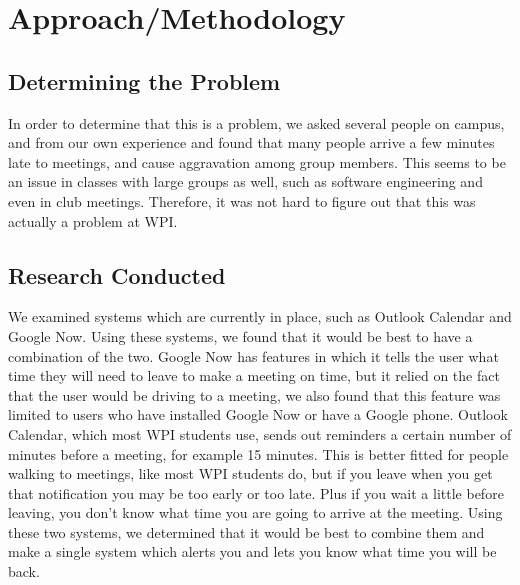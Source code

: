 \section{Approach/Methodology}

\subsection{Determining the Problem}
In order to determine that this is a problem, we asked several people on campus, and from our own experience and found that many people arrive a few minutes late to meetings, and cause aggravation among group members. This seems to be an issue in classes with large groups as well, such as software engineering and even in club meetings. Therefore, it was not hard to figure out that this was actually a problem at WPI. 

\subsection{Research Conducted}
We examined systems which are currently in place, such as Outlook Calendar and Google Now. Using these systems, we found that it would be best to have a combination of the two. Google Now has features in which it tells the user what time they will need to leave to make a meeting on time, but it relied on the fact that the user would be driving to a meeting, we also found that this feature was limited to users who have installed Google Now or have a Google phone. Outlook Calendar, which most WPI students use, sends out reminders a certain number of minutes before a meeting, for example 15 minutes. This is better fitted for people walking to meetings, like most WPI students do, but if you leave when you get that notification you may be too early or too late. Plus if you wait a little before leaving, you don't know what time you are going to arrive at the meeting. Using these two systems, we determined that it would be best to combine them and make a single system which alerts you and lets you know what time you will be back.


